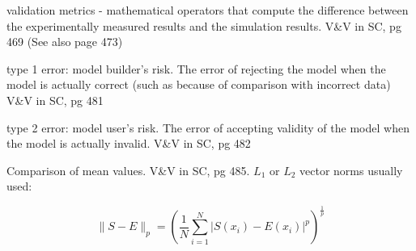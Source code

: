 \documentclass{article}
\begin{document}
validation metrics - mathematical operators that compute the difference between the experimentally measured results and the simulation results.  V\&V in SC, pg 469 (See also page 473)

type 1 error: model builder's risk.  The error of rejecting the model when the model is actually correct (such as because of comparison with incorrect data) V\&V in SC, pg 481

type 2 error: model user's risk.  The error of accepting validity of the model when the model is actually invalid.  V\&V in SC, pg 482


Comparison of mean values.  V\&V in SC, pg 485.  $L_1$ or $L_2$ vector norms usually used:

\begin{equation}
  \| S - E \|_p = \left(\frac{1}{N}\sum^N_{i=1} | S(x_i) - E(x_i)|^p \right)^\frac{1}{p}
\end{equation}
\end{document}
